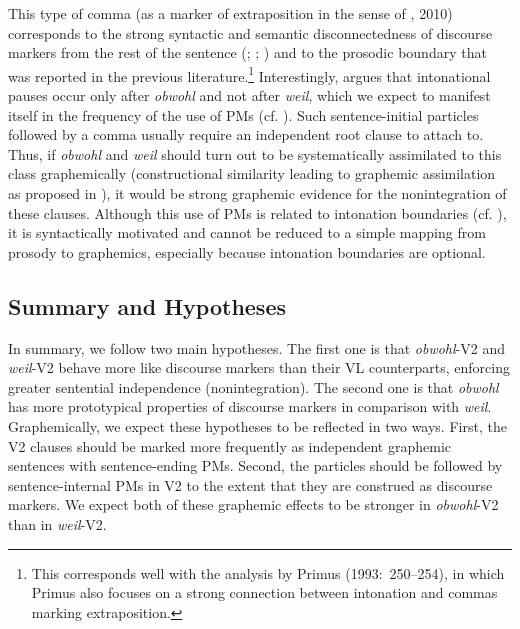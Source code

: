 This type of comma (as a marker of extraposition in the sense of \citealt{Primus1993}, 2010) corresponds to the strong syntactic and semantic disconnectedness of discourse markers from the rest of the sentence (; \citealt{AuerGünthner2005}; \citealt{Breindl2009}) and to the prosodic boundary that was reported in the previous literature.\footnote{This corresponds well with the analysis by Primus (1993:~250–254), in which Primus also focuses on a strong connection between intonation and commas marking extraposition.} Interestingly, \citet{Breindl2009} argues that intonational pauses occur only after \textit{obwohl} and not after \textit{weil}, which we expect to manifest itself in the frequency of the use of PMs (cf. ). Such sentence-initial particles followed by a comma usually require an independent root clause to attach to. Thus, if \textit{obwohl} and \textit{weil} should turn out to be systematically assimilated to this class graphemically (constructional similarity leading to graphemic assimilation as proposed in ), it would be strong graphemic evidence for the nonintegration of these clauses. Although this use of PMs is related to intonation boundaries (cf. ), it is syntactically motivated and cannot be reduced to a simple mapping from prosody to graphemics, especially because intonation boundaries are optional.



\subsection{Summary and Hypotheses}



In summary, we follow two main hypotheses. The first one is that \textit{obwohl}{}-V2 and \textit{weil}{}-V2 behave more like discourse markers than their VL counterparts, enforcing greater sentential independence (nonintegration). The second one is that \textit{obwohl} has more prototypical properties of discourse markers in comparison with \textit{weil}. Graphemically, we expect these hypotheses to be reflected in two ways. First, the V2 clauses should be marked more frequently as independent graphemic sentences with sentence-ending PMs. Second, the particles should be followed by sentence-internal PMs in V2 to the extent that they are construed as discourse markers. We expect both of these graphemic effects to be stronger in \textit{obwohl}{}-V2 than in \textit{weil}{}-V2.



